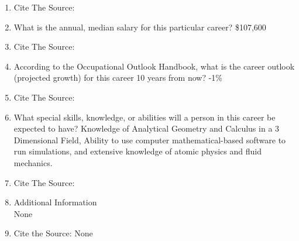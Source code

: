 \documentclass{article}
\begin{document}
\begin{enumerate}
    \item Cite The Source: \\
    \vspace{5pt}
    \cite{educReq}
    
    \item What is the annual, median salary for this particular career?
    \$107,600
    
    \item Cite The Source: \\
    \vspace{5pt}
    \cite{oneStop}
    
    \item According to the Occupational Outlook Handbook, what is the career outlook (projected growth) for this career 10 years from now?
    -1\%
    
    \item Cite The Source: \\
    \vspace{5pt}
    \cite{oneStop}
    
    \item What special skills, knowledge, or abilities will a person in this career be expected to have?
    Knowledge of Analytical Geometry and Calculus in a 3 Dimensional Field, Ability to use computer mathematical-based software to run simulations, and extensive knowledge of atomic physics and fluid mechanics.
    
    \item Cite The Source: \\
    \vspace{5pt}
    \cite{workNature:1}
    
    \item Additional Information\\
    None
    
    \item Cite the Source:
    None
    
\end{enumerate}

\printbibliography
\end{document}
